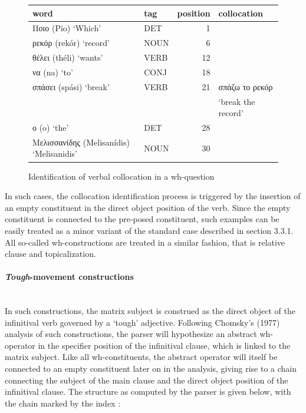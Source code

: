 \documentclass[output=paper]{langsci/langscibook}
\begin{document}
\finex


\begin{figure}[h]
  {\small 
\begin{tabular}{llrl}
word & tag & position & collocation \\ \hline
{Ποιο} (Pio) `Which' & 	DET & 	1	\\
{ρεκόρ} (rekór) `record' & NOUN & 	6 		 \\
{θέλει}	 (théli) `wants' & VERB & 	12	 \\
{να}	(na) `to' & CONJ	 & 18	 \\
{σπάσει}	(spási) `break' & VERB & 	21	 & 	{σπάζω το ρεκόρ} \\ & & & `break the record'\\
{ο}  (o) `the' & DET & 	28	 \\
{Μελισσανίδης}	(Melisanídis) `Melisanidis' & NOUN	 & 30		 \\

\end{tabular}
 }
 \caption{\label{fig4}Identification of verbal collocation in a wh-question}
\end{figure} 


In such cases, the collocation identification process is triggered by the insertion of an empty constituent in the direct object position of the verb. Since the empty constituent is connected to the pre-posed constituent, such examples can be easily treated as a minor variant of the standard case described in section 3.3.1. All so-called wh-constructions are treated in a similar fashion, that is relative clause and topicalization. 

\paragraph*{\textit{Tough}-movement constructions}  {~~~} \\
In such constructions, the matrix subject is construed as the direct object of the infinitival verb governed by a `tough' adjective. Following %
Chomsky's (1977) analysis of such constructions, the parser will hypothesize an abstract wh-operator in the specifier position of the infinitival clause, which is linked to the matrix subject. Like all wh-constituents, the abstract operator will itself be connected to an empty constituent later on in the analysis, giving rise to a chain connecting the subject of the main clause and the direct object position of the infinitival clause. The structure as computed by the parser is given below, with the chain marked by the index :
\end{document}
